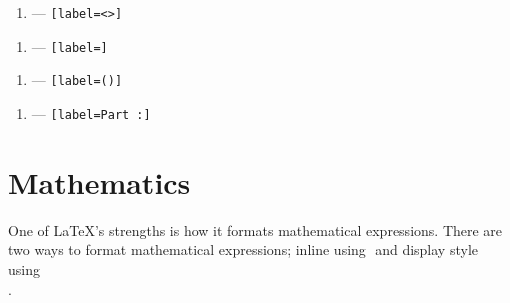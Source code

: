 \documentclass[11pt, twoside]{article}
\begin{document}
\begin{enumerate}[label=<\Roman*>]
    \item --- \texttt{[label=<\Roman*>]}
\end{enumerate}
\begin{enumerate}[label=\roman*]
    \item --- \texttt{[label=\roman*]}
\end{enumerate}
\begin{enumerate}[label=(\alph*)]
    \item --- \texttt{[label=(\alph*)]}
\end{enumerate}
\begin{enumerate}[label=Part \Alph*:]
    \item --- \texttt{[label=Part \Alph*:]}
\end{enumerate}
\newpage
\section{Mathematics}
One of \LaTeX{}'s strengths is how it formats mathematical expressions.
There are two ways to format mathematical expressions; inline using
\texttt{\( \)} and display style using \texttt{\[ \]}.
\end{document}
